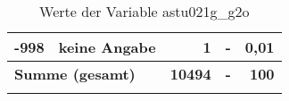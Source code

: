 \begin{longtable}{Xlrrr}
       -998 & keine Angabe & 1 & - & 0,01 \\

     \midrule
     \multicolumn{2}{l}{\textbf{Summe (gesamt)}} & \textbf{10494} & \textbf{-} & \textbf{100} \\
     \bottomrule
     \caption{Werte der Variable astu021g\_g2o}
     \end{longtable}
     
